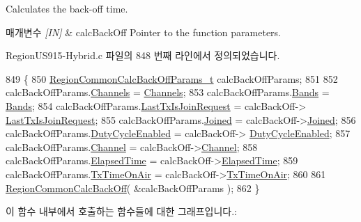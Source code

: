 Calculates the back-\/off time. 


\begin{DoxyParams}{매개변수}
{\em \mbox{[}\+I\+N\mbox{]}} & calc\+Back\+Off Pointer to the function parameters. \\
\hline
\end{DoxyParams}


Region\+U\+S915-\/\+Hybrid.\+c 파일의 848 번째 라인에서 정의되었습니다.


\begin{DoxyCode}
849 \{
850     \mbox{\hyperlink{structs_region_common_calc_back_off_params}{RegionCommonCalcBackOffParams\_t}} calcBackOffParams;
851 
852     calcBackOffParams.\mbox{\hyperlink{structs_region_common_calc_back_off_params_afecbd1e457cbd79eb7072bd140ff33d4}{Channels}} = \mbox{\hyperlink{_region_u_s915-_hybrid_8c_a2781ea69a73fdddcc54719ec4775751f}{Channels}};
853     calcBackOffParams.\mbox{\hyperlink{structs_region_common_calc_back_off_params_a18afce97f43b46e9d294e5babbb15f15}{Bands}} = \mbox{\hyperlink{_region_u_s915-_hybrid_8c_acdf8c87a5e1e73b468dbf151f92e2273}{Bands}};
854     calcBackOffParams.\mbox{\hyperlink{structs_region_common_calc_back_off_params_a4088d0ca2ff21fd5cdc110e14816dd53}{LastTxIsJoinRequest}} = calcBackOff->
      \mbox{\hyperlink{structs_calc_back_off_params_a4088d0ca2ff21fd5cdc110e14816dd53}{LastTxIsJoinRequest}};
855     calcBackOffParams.\mbox{\hyperlink{structs_region_common_calc_back_off_params_ac2f6caa0f3b02d2ac5056c3ee7c22652}{Joined}} = calcBackOff->\mbox{\hyperlink{structs_calc_back_off_params_ac2f6caa0f3b02d2ac5056c3ee7c22652}{Joined}};
856     calcBackOffParams.\mbox{\hyperlink{structs_region_common_calc_back_off_params_a4d755868e0e80089462286c3ba6a6f18}{DutyCycleEnabled}} = calcBackOff->
      \mbox{\hyperlink{structs_calc_back_off_params_a4d755868e0e80089462286c3ba6a6f18}{DutyCycleEnabled}};
857     calcBackOffParams.\mbox{\hyperlink{structs_region_common_calc_back_off_params_a1ca6f01ca18afe402de51babe8c95f5e}{Channel}} = calcBackOff->\mbox{\hyperlink{structs_calc_back_off_params_a1ca6f01ca18afe402de51babe8c95f5e}{Channel}};
858     calcBackOffParams.\mbox{\hyperlink{structs_region_common_calc_back_off_params_a2ece30988e7a5bac284623173173c71a}{ElapsedTime}} = calcBackOff->\mbox{\hyperlink{structs_calc_back_off_params_a2ece30988e7a5bac284623173173c71a}{ElapsedTime}};
859     calcBackOffParams.\mbox{\hyperlink{structs_region_common_calc_back_off_params_aa17a8607485db100d315e74853dd217e}{TxTimeOnAir}} = calcBackOff->\mbox{\hyperlink{structs_calc_back_off_params_aa17a8607485db100d315e74853dd217e}{TxTimeOnAir}};
860 
861     \mbox{\hyperlink{group___r_e_g_i_o_n_c_o_m_m_o_n_gae2b1dfba27c79f605048f2d9869dc57d}{RegionCommonCalcBackOff}}( &calcBackOffParams );
862 \}
\end{DoxyCode}
이 함수 내부에서 호출하는 함수들에 대한 그래프입니다.\+:
\mbox{\label{group___r_e_g_i_o_n_u_s915_h_y_b_gab7d8969e0b1037572a6703d7995c44e3}} 
